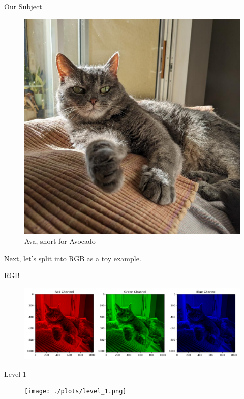 \documentclass[9pt]{beamer}
\begin{document}
\begin{frame}{Our Subject}
	\begin{figure}[h]
		\centering
		\includegraphics[scale=0.2]{./data/cat.jpg}
		\caption{Ava, \tiny short for Avocado}
	\end{figure}
	Next, let's split into RGB as a toy example.
\end{frame}

\begin{frame}{RGB}
	\begin{figure}[h]
		\centering
		\includegraphics[width=\textwidth]{./plots/channelsplit.png}
	\end{figure}
\end{frame}

\begin{frame}{Level 1}
	\begin{figure}
		\centering
		\texttt{[image: ./plots/level\_1.png]}
	\end{figure}
\end{frame}
\end{document}
